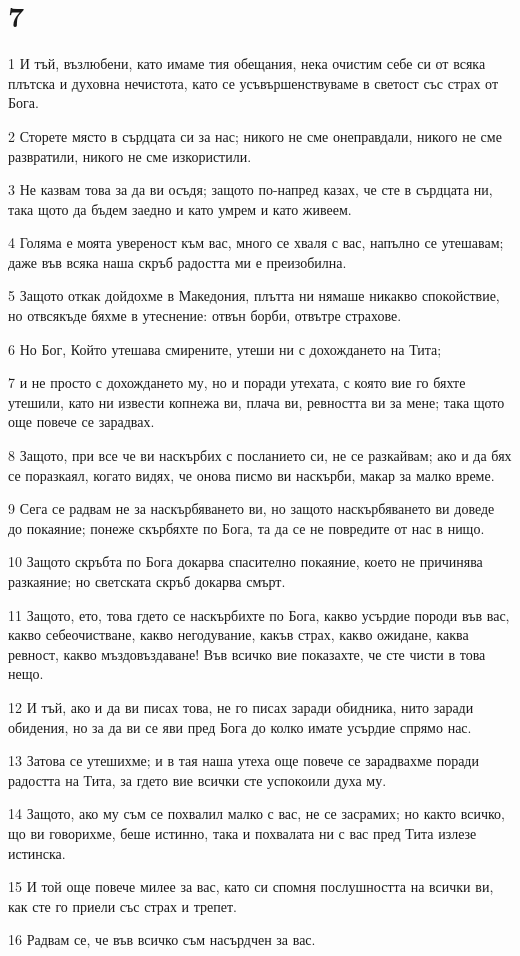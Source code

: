\chapter{7}

\par 1 И тъй, възлюбени, като имаме тия обещания, нека очистим себе си от всяка плътска и духовна нечистота, като се усъвършенствуваме в светост със страх от Бога.
\par 2 Сторете място в сърдцата си за нас; никого не сме онеправдали, никого не сме развратили, никого не сме изкористили.
\par 3 Не казвам това за да ви осъдя; защото по-напред казах, че сте в сърдцата ни, така щото да бъдем заедно и като умрем и като живеем.
\par 4 Голяма е моята увереност към вас, много се хваля с вас, напълно се утешавам; даже във всяка наша скръб радостта ми е преизобилна.
\par 5 Защото откак дойдохме в Македония, плътта ни нямаше никакво спокойствие, но отвсякъде бяхме в утеснение: отвън борби, отвътре страхове.
\par 6 Но Бог, Който утешава смирените, утеши ни с дохождането на Тита;
\par 7 и не просто с дохождането му, но и поради утехата, с която вие го бяхте утешили, като ни извести копнежа ви, плача ви, ревността ви за мене; така щото още повече се зарадвах.
\par 8 Защото, при все че ви наскърбих с посланието си, не се разкайвам; ако и да бях се поразкаял, когато видях, че онова писмо ви наскърби, макар за малко време.
\par 9 Сега се радвам не за наскърбяването ви, но защото наскърбяването ви доведе до покаяние; понеже скърбяхте по Бога, та да се не повредите от нас в нищо.
\par 10 Защото скръбта по Бога докарва спасително покаяние, което не причинява разкаяние; но светската скръб докарва смърт.
\par 11 Защото, ето, това гдето се наскърбихте по Бога, какво усърдие породи във вас, какво себеочистване, какво негодувание, какъв страх, какво ожидане, каква ревност, какво мъздовъздаване! Във всичко вие показахте, че сте чисти в това нещо.
\par 12 И тъй, ако и да ви писах това, не го писах заради обидника, нито заради обидения, но за да ви се яви пред Бога до колко имате усърдие спрямо нас.
\par 13 Затова се утешихме; и в тая наша утеха още повече се зарадвахме поради радостта на Тита, за гдето вие всички сте успокоили духа му.
\par 14 Защото, ако му съм се похвалил малко с вас, не се засрамих; но както всичко, що ви говорихме, беше истинно, така и похвалата ни с вас пред Тита излезе истинска.
\par 15 И той още повече милее за вас, като си спомня послушността на всички ви, как сте го приели със страх и трепет.
\par 16 Радвам се, че във всичко съм насърдчен за вас.

